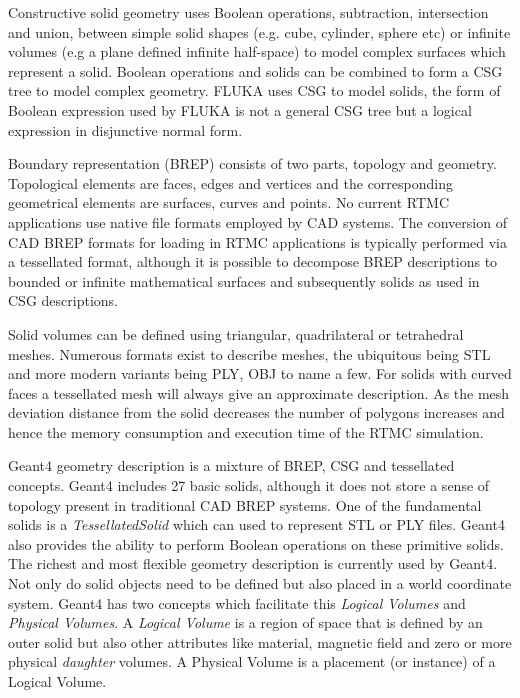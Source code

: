 \documentclass[final,5p,times,twocolumn]{elsarticle}
\begin{document}
Constructive solid geometry uses Boolean operations, subtraction, intersection and union, between simple solid shapes (e.g. cube, cylinder, sphere etc) or infinite
volumes (e.g a plane defined infinite half-space) to model complex surfaces which represent a solid. Boolean operations and solids can be combined to form a 
CSG tree to model complex geometry. FLUKA uses CSG to model solids, the form of Boolean expression used by FLUKA is not a general CSG tree but a 
logical expression in disjunctive normal form.

Boundary representation (BREP) consists of two parts, topology and geometry. Topological elements are faces, edges and vertices and the corresponding
geometrical elements are surfaces, curves and points. No current RTMC applications use native file formats employed by CAD systems. The conversion of 
CAD BREP formats for loading in RTMC applications is typically performed via a tessellated format, although it is possible to decompose BREP descriptions
 to bounded or infinite mathematical surfaces and subsequently solids as used in CSG descriptions. 

Solid volumes can be defined using triangular, quadrilateral or tetrahedral meshes. Numerous formats exist to describe meshes, the ubiquitous being STL and 
more modern variants being PLY, OBJ to name a few. For solids with curved faces a tessellated mesh will always give an approximate description. As the mesh 
deviation distance from the solid decreases the number of polygons increases and hence the memory consumption and execution time of the RTMC simulation. 

Geant4 geometry description is a mixture of BREP, CSG and tessellated concepts. Geant4 includes 27 basic solids, although it does not store a sense 
of topology present in traditional CAD BREP systems. One of the fundamental solids is a {\em TessellatedSolid} which can used to represent STL or PLY files. 
Geant4 also provides the ability to perform Boolean operations on these primitive solids. The richest and most flexible geometry description is currently used by
Geant4. Not only do solid objects need to be defined but also placed in a world coordinate system. Geant4 has two concepts which facilitate this {\it Logical Volumes} and {\it Physical Volumes}. A {\it Logical Volume} is a region of space  that is defined by an outer solid but also other attributes like material, magnetic field 
and zero or more physical {\it daughter} volumes. A Physical Volume is a placement (or instance) of a Logical Volume.   
\end{document}
